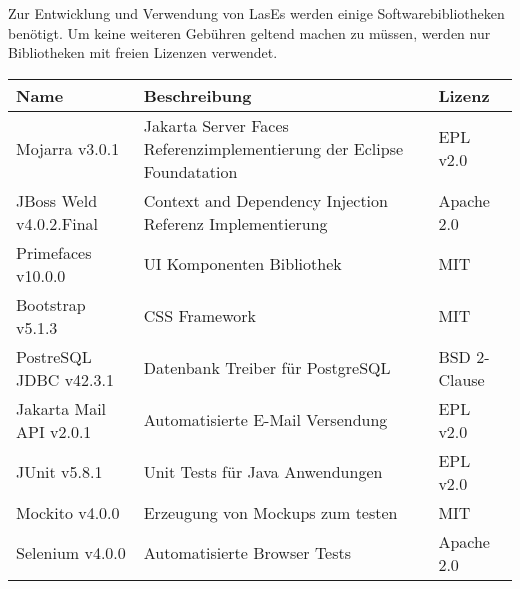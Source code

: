 
Zur Entwicklung und Verwendung von LasEs werden einige Softwarebibliotheken benötigt. Um keine weiteren Gebühren geltend machen zu müssen, werden nur Bibliotheken mit freien Lizenzen verwendet.

\begin{table}[H]
	\centering
	\begin{tabularx}{\columnwidth}{|l|X|l|}
		\hline
		Name & Beschreibung & Lizenz \\
		\hline\hline
		Mojarra v3.0.1 & Jakarta Server Faces Referenzimplementierung der Eclipse Foundatation & EPL v2.0 \\
		\hline
		JBoss Weld v4.0.2.Final & Context and Dependency Injection Referenz Implementierung & Apache 2.0 \\
		\hline
		Primefaces v10.0.0 & UI Komponenten Bibliothek & MIT \\
		\hline
		Bootstrap v5.1.3 & CSS Framework & MIT \\
		\hline
		PostreSQL JDBC v42.3.1 & Datenbank Treiber für PostgreSQL & BSD 2-Clause \\
		\hline
		Jakarta Mail API v2.0.1 & Automatisierte E-Mail Versendung & EPL v2.0 \\
		\hline
		JUnit v5.8.1 & Unit Tests für Java Anwendungen & EPL v2.0 \\
		\hline
		Mockito v4.0.0 & Erzeugung von Mockups zum testen & MIT \\
		\hline
		Selenium v4.0.0 & Automatisierte Browser Tests & Apache 2.0 \\
		\hline



	\end{tabularx}
\end{table}
